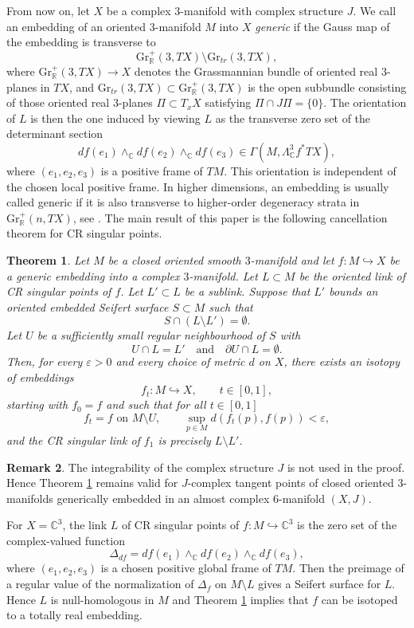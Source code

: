 \documentclass[12pt]{amsart}
\newtheorem{theorem}{Theorem}%
\theoremstyle{definition}
\newtheorem{remark}[theorem]{Remark}
\newcommand{\C}{\mathbb{C}}
\newcommand{\R}{\mathbb{R}}
\newcommand{\Grr}{{\mathrm{Gr}}_\R}
\newcommand{\Grtr}{{\mathrm{Gr}_{tr}}}
\newcommand\hra{\hookrightarrow}
\numberwithin{equation}{section}
\begin{document}
From now on, let $X$ be a complex $3$-manifold with complex structure $J$. We call an embedding of an oriented $3$-manifold $M$ into $X$ \emph{generic} if the Gauss map of the embedding is transverse to
\[\Grr^+(3,TX)\setminus \Grtr(3,TX),\]
where $\Grr^+(3,TX)\to X$  denotes the Grassmannian bundle of oriented real $3$-planes in $TX$, and $\Grtr(3,TX)\subset \Grr^+(3,TX)$ is the open subbundle consisting of those oriented real $3$-planes $\Pi\subset T_xX$ satisfying $
\Pi\cap J\Pi=\{0\}.$ The orientation of $L$ is then the one induced by viewing $L$ as the transverse zero set of the determinant section
\[df(e_1)\wedge_{\C}df(e_2)\wedge_{\C}df(e_3)
\in \Gamma\left(M,\Lambda_{\C}^3 f^*TX\right),\]
where $(e_1,e_2,e_3)$ is a positive frame of $TM$. This orientation is independent of the chosen local positive frame.
In higher dimensions, an embedding is usually called generic if it is also transverse to higher-order degeneracy strata in $\Grr^+(n,TX)$, see \cite{Lai}. The main result of this paper is the following cancellation theorem for CR singular points. 

\begin{theorem}\label{thm1}
Let $M$ be a closed oriented smooth $3$-manifold and let $f:M\hookrightarrow X$ be a generic embedding into a complex $3$-manifold. Let $L\subset M$ be the oriented link of CR singular points of $f$. Let $L'\subset L$ be a sublink. Suppose that $L'$ bounds an oriented embedded Seifert surface $S\subset M$ such that
\[S\cap (L\setminus L')=\emptyset.\] 
Let $U$ be a sufficiently small regular neighbourhood of $S$ with
\[U\cap L=L'\quad \text{and}\quad \partial U\cap L=\emptyset.\]
Then, for every $\varepsilon>0$ and every choice of metric $d$ on $X$, there exists an isotopy of embeddings
\[f_t:M\hookrightarrow X,\qquad t\in[0,1],\]
starting with $f_0=f$ and such that for all $t\in[0,1]$
\[f_t=f \text{ on } M\setminus U,\qquad \sup_{p\in M}d(f_t(p),f(p))<\varepsilon,\]
and the CR singular link of $f_1$ is precisely $L\setminus L'$.
\end{theorem}

\begin{remark} 
The integrability of the complex structure $J$ is not used in the proof. Hence Theorem \ref{thm1} remains valid for 
$J$-complex tangent points of closed oriented $3$-manifolds generically embedded in an almost complex $6$-manifold $(X,J)$.
\end{remark}

For $X=\C^3$, the link $L$ of CR singular points of $f:M\hra \C^3$ is the zero set of the complex-valued function
\[\Delta_{df} = df(e_1)\wedge_{\mathbb C}df(e_2)\wedge_{\mathbb C}df(e_3),\]
where $(e_1,e_2,e_3)$ is a chosen positive global frame of $TM$. Then the preimage of a regular value of the normalization of $\Delta_f$ on $M \setminus L$ gives a Seifert surface for $L$. Hence $L$ is null-homologous in $M$ and Theorem \ref{thm1} implies that $f$ can be isotoped to a totally real embedding.
\end{document}
